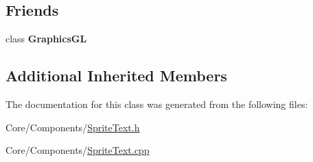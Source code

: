 \subsection*{Friends}
\begin{DoxyCompactItemize}
\item 
\hypertarget{classDCEngine_1_1Components_1_1SpriteText_ae9935fef993313b67d691534d6fe5b4f}{class {\bfseries Graphics\-G\-L}}\label{classDCEngine_1_1Components_1_1SpriteText_ae9935fef993313b67d691534d6fe5b4f}

\end{DoxyCompactItemize}
\subsection*{Additional Inherited Members}


The documentation for this class was generated from the following files\-:\begin{DoxyCompactItemize}
\item 
Core/\-Components/\hyperlink{SpriteText_8h}{Sprite\-Text.\-h}\item 
Core/\-Components/\hyperlink{SpriteText_8cpp}{Sprite\-Text.\-cpp}\end{DoxyCompactItemize}
